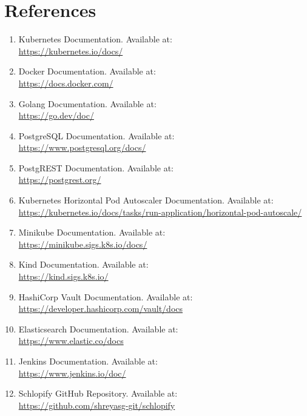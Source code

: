 \documentclass[12pt,a4paper]{report}
\begin{document}
\newpage

\chapter{References}

\begin{enumerate}

    \item Kubernetes Documentation. Available at: \\
    \url{https://kubernetes.io/docs/}

    \item Docker Documentation. Available at: \\
    \url{https://docs.docker.com/}

    \item Golang Documentation. Available at: \\
    \url{https://go.dev/doc/}

    \item PostgreSQL Documentation. Available at: \\
    \url{https://www.postgresql.org/docs/}

    \item PostgREST Documentation. Available at: \\
    \url{https://postgrest.org/}

    \item Kubernetes Horizontal Pod Autoscaler Documentation. Available at: \\
    \url{https://kubernetes.io/docs/tasks/run-application/horizontal-pod-autoscale/}

    \item Minikube Documentation. Available at: \\
    \url{https://minikube.sigs.k8s.io/docs/}

    \item Kind Documentation. Available at: \\
    \url{https://kind.sigs.k8s.io/}

    \item HashiCorp Vault Documentation. Available at: \\
    \url{https://developer.hashicorp.com/vault/docs}

    \item Elasticsearch Documentation. Available at: \\
    \url{https://www.elastic.co/docs}

    \item Jenkins Documentation. Available at: \\
    \url{https://www.jenkins.io/doc/}

    \item Schlopify GitHub Repository. Available at: \\
    \url{https://github.com/shreyasg-git/schlopify}

\end{enumerate}
\end{document}
